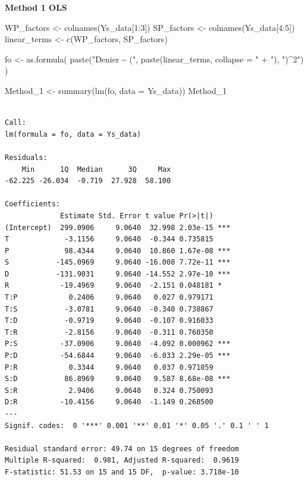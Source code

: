 \documentclass[
  letterpaper,
  DIV=11,
  numbers=noendperiod]{scrartcl}
\newenvironment{Shaded}{\begin{snugshade}}{\end{snugshade}}
\newcommand{\AttributeTok}[1]{\textcolor[rgb]{0.40,0.45,0.13}{#1}}
\newcommand{\DecValTok}[1]{\textcolor[rgb]{0.68,0.00,0.00}{#1}}
\newcommand{\FunctionTok}[1]{\textcolor[rgb]{0.28,0.35,0.67}{#1}}
\newcommand{\NormalTok}[1]{\textcolor[rgb]{0.00,0.23,0.31}{#1}}
\newcommand{\OtherTok}[1]{\textcolor[rgb]{0.00,0.23,0.31}{#1}}
\newcommand{\SpecialCharTok}[1]{\textcolor[rgb]{0.37,0.37,0.37}{#1}}
\newcommand{\StringTok}[1]{\textcolor[rgb]{0.13,0.47,0.30}{#1}}
\begin{document}
\textbf{Method 1 OLS}

\begin{Shaded}
\begin{Highlighting}[]
\NormalTok{WP\_factors }\OtherTok{\textless{}{-}} \FunctionTok{colnames}\NormalTok{(Ys\_data[}\DecValTok{1}\SpecialCharTok{:}\DecValTok{3}\NormalTok{])}
\NormalTok{SP\_factors }\OtherTok{\textless{}{-}} \FunctionTok{colnames}\NormalTok{(Ys\_data[}\DecValTok{4}\SpecialCharTok{:}\DecValTok{5}\NormalTok{])}
\NormalTok{linear\_terms }\OtherTok{\textless{}{-}} \FunctionTok{c}\NormalTok{(WP\_factors, SP\_factors)}

\NormalTok{fo }\OtherTok{\textless{}{-}} \FunctionTok{as.formula}\NormalTok{(}
  \FunctionTok{paste}\NormalTok{(}\StringTok{"Denier \textasciitilde{} ("}\NormalTok{, }\FunctionTok{paste}\NormalTok{(linear\_terms, }\AttributeTok{collapse =} \StringTok{" + "}\NormalTok{), }\StringTok{")\^{}2"}\NormalTok{)}
\NormalTok{)}

\NormalTok{Method\_1 }\OtherTok{\textless{}{-}} \FunctionTok{summary}\NormalTok{(}\FunctionTok{lm}\NormalTok{(fo, }\AttributeTok{data =}\NormalTok{ Ys\_data))}
\NormalTok{Method\_1}
\end{Highlighting}
\end{Shaded}

\begin{verbatim}

Call:
lm(formula = fo, data = Ys_data)

Residuals:
    Min      1Q  Median      3Q     Max 
-62.225 -26.034  -0.719  27.928  58.100 

Coefficients:
             Estimate Std. Error t value Pr(>|t|)    
(Intercept)  299.0906     9.0640  32.998 2.03e-15 ***
T             -3.1156     9.0640  -0.344 0.735815    
P             98.4344     9.0640  10.860 1.67e-08 ***
S           -145.0969     9.0640 -16.008 7.72e-11 ***
D           -131.9031     9.0640 -14.552 2.97e-10 ***
R            -19.4969     9.0640  -2.151 0.048181 *  
T:P            0.2406     9.0640   0.027 0.979171    
T:S           -3.0781     9.0640  -0.340 0.738867    
T:D           -0.9719     9.0640  -0.107 0.916033    
T:R           -2.8156     9.0640  -0.311 0.760350    
P:S          -37.0906     9.0640  -4.092 0.000962 ***
P:D          -54.6844     9.0640  -6.033 2.29e-05 ***
P:R            0.3344     9.0640   0.037 0.971059    
S:D           86.8969     9.0640   9.587 8.68e-08 ***
S:R            2.9406     9.0640   0.324 0.750093    
D:R          -10.4156     9.0640  -1.149 0.268500    
---
Signif. codes:  0 '***' 0.001 '**' 0.01 '*' 0.05 '.' 0.1 ' ' 1

Residual standard error: 49.74 on 15 degrees of freedom
Multiple R-squared:  0.981, Adjusted R-squared:  0.9619 
F-statistic: 51.53 on 15 and 15 DF,  p-value: 3.718e-10
\end{verbatim}
\end{document}
